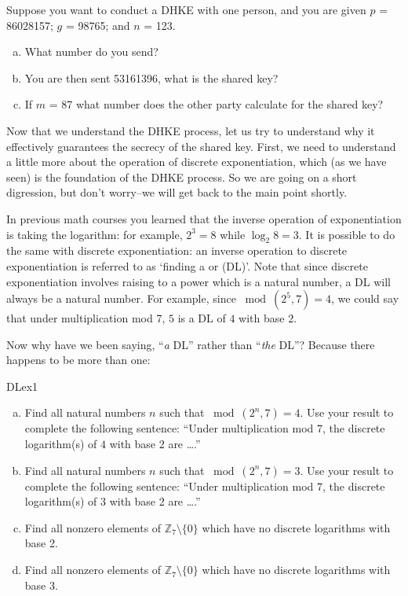 \begin{exer}
Suppose you want to conduct a DHKE with one person, and you are given $p$ = 86028157; $g$ = 98765; and $n$ = 123.  
\begin{enumerate}[(a)]
\item	What number do you send?  

\item You are then sent 53161396, what is the shared key? 

\item If $m$ = 87 what number does the other party calculate for the shared key?
\end{enumerate}
\end{exer}
Now that we understand the DHKE process, let us try to understand why it effectively guarantees the secrecy of the shared key. First, we need to understand a little more about the operation of discrete exponentiation, which (as we have seen) is the foundation of the DHKE process. So we are going on a short digression, but don't worry--we will get back to the main point shortly. 

In previous math courses you learned that the inverse operation of exponentiation is taking the logarithm: for example, $2^3 = 8$ while $\log_{2}8 = 3$.  It is possible to do the same with discrete exponentiation: an inverse operation to discrete exponentiation is  referred to as `finding a  or (DL)'. Note that since discrete exponentiation involves raising to a power which is a natural number, a  DL will always be a natural number.   For example, since $\bmod(2^5,7)=4$, we could say that under multiplication mod 7,  $5$ is a DL  of $4$ with base $2$.

 Now why have we been saying, ``\emph{a} DL'' rather than ``\emph{the} DL''? Because  there happens to be more than one:

\begin{exercise}{DLex1}
\begin{enumerate}[(a)]
\item
Find all natural numbers $n$ such that $\bmod(2^n,7)=4$.  Use your result to complete the following sentence: ``Under multiplication mod 7, the discrete logarithm(s) of $4$ with base 2  are \ldots.''
\item
Find all natural numbers $n$ such that $\bmod(2^n,7)=3$.  Use your result to complete the following sentence:  ``Under multiplication mod 7, the discrete logarithm(s) of $3$ with base 2 are \ldots.''
\item
Find all nonzero elements of $\mathbb{Z}_7 \setminus \{0\}$ which have no discrete logarithms with base 2.
\item
Find all nonzero elements of $\mathbb{Z}_7 \setminus \{0\}$ which have no discrete logarithms with base 3.
\end{enumerate}
\end{exercise}

